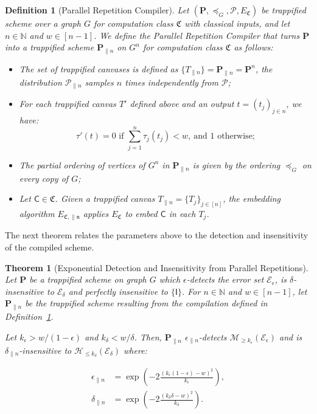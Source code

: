 \documentclass[12pt]{iopart}
\newcommand{\cptp}[1]{\mathsf{#1}} \newcommand{\pd}[1]{\mathcal{#1}}  \newcommand{\sch}[1]{\bm{#1}}
\newcommand{\Id}{\cptp{I}}
\renewcommand{\1}{\mathds{1}}
\newtheorem{theorem}{Theorem}
\newtheorem{definition}{Definition}
\begin{document}
\begin{definition}[Parallel Repetition Compiler]\label{def:par_compiler}
Let $(\sch P, \preceq_G, \pd P, E_{\mathfrak{C}})$ be trappified scheme over a graph $G$ for computation class $\mathfrak{C}$ with classical inputs, and let $n \in \mathbb{N}$ and $w \in [n-1]$. We define the Parallel Repetition Compiler that turns $\sch P$ into a trappified scheme $\sch P_{\parallel n}$ on $G^n$ for computation class $\mathfrak{C}$ as follows:

\begin{itemize}
	\item The set of trappified canvases is defined as $\{T_{\parallel n}\} = \sch P_{\parallel n} = \sch P^n$, the distribution $\pd P_{\parallel n}$ samples $n$ times independently from $\pd P$;
	\item For each trappified canvas $T'$ defined above and an output $t = (t_{j})_{j \in n}$, we have:
	\begin{equation}
		\tau'(t) = 
0 \text{ if } \sum_{j = 1}^n \tau_{j}(t_j) < w, \ \text{and } 1 \text{ otherwise;}
\end{equation}
	\item The partial ordering of vertices of $G^n$ in $\sch P_{\parallel n}$ is given by the ordering $\preceq_G$ on every copy of $G$;
	\item Let $\cptp C \in \mathfrak{C}$. Given a trappified canvas $T_{\parallel n} = \{T_j\}_{j \in [n]}$, the embedding algorithm $E_\mathfrak{C, \parallel n}$ applies $E_\mathfrak{C}$ to embed $\cptp C$ in each $T_j$.
\end{itemize}
\end{definition}

The next theorem relates the parameters above to the detection and insensitivity of the compiled scheme.

\begin{theorem}[Exponential Detection and Insensitivity from Parallel Repetitions]\label{thm:par-boost}
  Let $\sch P$ be a trappified scheme on graph $G$ which $\epsilon$-detects the error set $\mathcal{E}_\epsilon$, is $\delta$-insensitive to $\mathcal{E}_\delta$ and perfectly insensitive to $\{\Id\}$.
  For $n \in \mathbb{N}$ and $w \in [n-1]$, let $\sch P_{\parallel n}$ be the trappified scheme resulting from the compilation defined in Definition~\ref{def:par_compiler}.
  
  Let $k_\epsilon > w/(1-\epsilon)$ and $k_\delta < w/\delta$. Then, $\sch P_{\parallel n}$ $\epsilon_{\parallel n}$-detects $\mathcal{M}_{\geq k_\epsilon}(\mathcal{E}_\epsilon)$ and is $\delta_{\parallel n}$-insensitive to $\mathcal{H}_{\leq k_\delta}(\mathcal{E}_\delta)$ where:
  
  \begin{align}
  	\epsilon_{\parallel n} &= \exp \left( -2 \frac{(k_\epsilon(1-\epsilon) - w)^2}{k_\epsilon} \right),\\
  	\delta_{\parallel n} &= \exp \left( -2 \frac{(k_\delta\delta - w)^2}{k_\delta} \right).
  \end{align}
\end{theorem}
\end{document}
